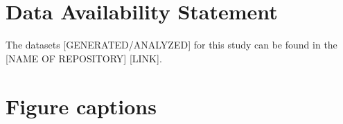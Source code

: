 \documentclass[utf8]{frontiersSCNS} %
\begin{document}
\section*{Data Availability Statement}
The datasets [GENERATED/ANALYZED] for this study can be found in the [NAME OF REPOSITORY] [LINK].




\section*{Figure captions}





\end{document}
